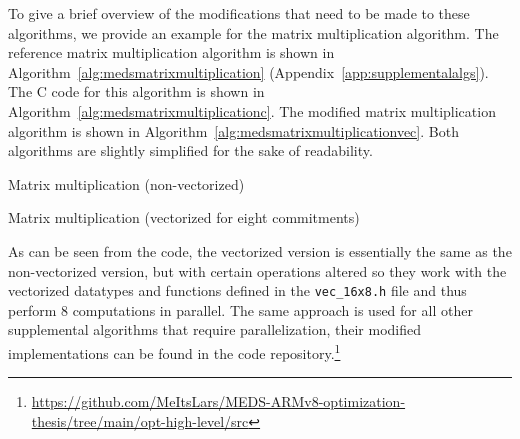 \documentclass[11pt,a4paper]{report}
\theoremstyle{definition}
\begin{document}
To give a brief overview of the modifications that need to be made to these algorithms, we provide an example for the matrix multiplication algorithm. The reference matrix multiplication algorithm is shown in Algorithm~\ref{alg:medsmatrixmultiplication} (Appendix~\ref{app:supplementalalgs}). The C code for this algorithm is shown in Algorithm~\ref{alg:medsmatrixmultiplicationc}. The modified matrix multiplication algorithm is shown in Algorithm~\ref{alg:medsmatrixmultiplicationvec}. Both algorithms are slightly simplified for the sake of readability.

\begin{algorithm}
  \caption{Matrix multiplication (non-vectorized)}
  \label{alg:medsmatrixmultiplicationc}
  
\end{algorithm}

\begin{algorithm}
  \caption{Matrix multiplication (vectorized for eight commitments)}
  \label{alg:medsmatrixmultiplicationvec}
  
\end{algorithm}

\pagebreak

As can be seen from the code, the vectorized version is essentially the same as the non-vectorized version, but with certain operations altered so they work with the vectorized datatypes and functions defined in the \texttt{vec\_16x8.h} file and thus perform 8 computations in
parallel. The same approach is used for all other supplemental algorithms that require parallelization, their modified implementations can be found in the code repository.\footnote{\url{https://github.com/MeItsLars/MEDS-ARMv8-optimization-thesis/tree/main/opt-high-level/src}}
\end{document}
